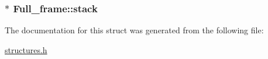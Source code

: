 \subsubsection[{\texorpdfstring{stack}{stack}}]{$\ast$ Full\+\_\+frame\+::stack}\hypertarget{structFull__frame_a40ff4ea967461300e1ce8dbb51e28fa0}{}\label{structFull__frame_a40ff4ea967461300e1ce8dbb51e28fa0}


The documentation for this struct was generated from the following file\+:\begin{DoxyCompactItemize}
\item 
\hyperlink{structures_8h}{structures.\+h}\end{DoxyCompactItemize}

